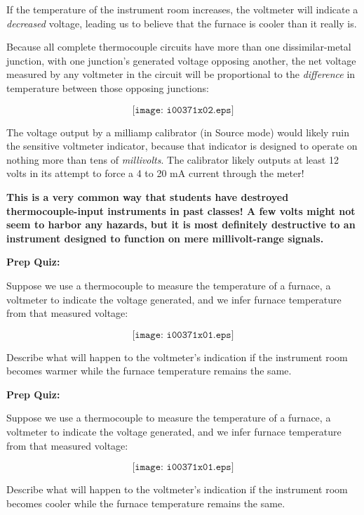 





If the temperature of the instrument room increases, the voltmeter will indicate a {\it decreased} voltage, leading us to believe that the furnace is cooler than it really is.

\vskip 10pt

Because all complete thermocouple circuits have more than one dissimilar-metal junction, with one junction's generated voltage opposing another, the net voltage measured by any voltmeter in the circuit will be proportional to the {\it difference} in temperature between those opposing junctions:

$$\texttt{[image: i00371x02.eps]}$$

The voltage output by a milliamp calibrator (in Source mode) would likely ruin the sensitive voltmeter indicator, because that indicator is designed to operate on nothing more than tens of {\it millivolts}.  The calibrator likely outputs at least 12 volts in its attempt to force a 4 to 20 mA current through the meter!

\vskip 10pt

{\bf This is a very common way that students have destroyed thermocouple-input instruments in past classes!  A few volts might not seem to harbor any hazards, but it is most definitely destructive to an instrument designed to function on mere millivolt-range signals.}





\vfil \eject

\noindent
{\bf Prep Quiz:}

Suppose we use a thermocouple to measure the temperature of a furnace, a voltmeter to indicate the voltage generated, and we infer furnace temperature from that measured voltage:

$$\texttt{[image: i00371x01.eps]}$$

Describe what will happen to the voltmeter's indication if the instrument room becomes warmer while the furnace temperature remains the same.

\vfil \eject

\noindent
{\bf Prep Quiz:}

Suppose we use a thermocouple to measure the temperature of a furnace, a voltmeter to indicate the voltage generated, and we infer furnace temperature from that measured voltage:

$$\texttt{[image: i00371x01.eps]}$$

Describe what will happen to the voltmeter's indication if the instrument room becomes cooler while the furnace temperature remains the same.





